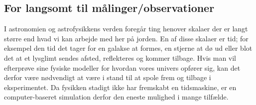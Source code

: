 \subsection{For langsomt til målinger/observationer}
I astronomien og astrofysikkens verden foregår ting henover skalaer der er
langt større end hvad vi kan arbejde med her på jorden. En af disse skalaer
er tid; for eksempel den tid det tager for en galakse at formes, en stjerne
at dø ud eller blot det at et lysglimt sendes afsted, reflekteres og kommer
tilbage.
Hvis man vil efterprøve sine fysiske modeller for hvordan vores univers
opfører sig, kan det derfor være nødvendigt at være i stand til at spole
frem og tilbage i eksperimentet. Da fysikken stadigt ikke har fremskabt en
tidsmaskine, er en computer-baseret simulation derfor den eneste mulighed i
mange tilfælde.
